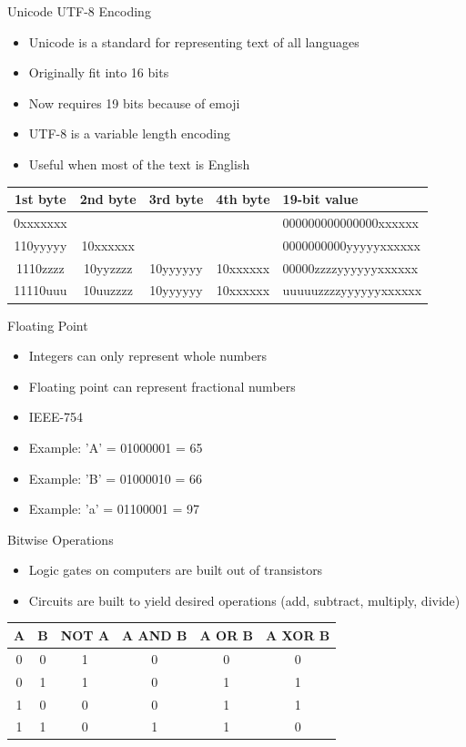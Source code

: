 \begin{withoutheadline}
\begin{frame}{Unicode UTF-8 Encoding}
\begin{itemize}
    \item Unicode is a standard for representing text of all languages
    \item Originally fit into 16 bits
    \item Now requires 19 bits because of emoji
    \item UTF-8 is a variable length encoding
    \item Useful when most of the text is English
\end{itemize}
\begin{tabular}{c|c|c|c} \toprule
1st byte & 2nd byte & 3rd byte & 4th byte & 19-bit value          \\ \midrule
0xxxxxxx &          &          &          & 000000000000000xxxxxx \\
110yyyyy & 10xxxxxx &          &          & 0000000000yyyyyxxxxxx \\
1110zzzz & 10yyzzzz & 10yyyyyy & 10xxxxxx & 00000zzzzyyyyyyxxxxxx \\
11110uuu & 10uuzzzz & 10yyyyyy & 10xxxxxx & uuuuuzzzzyyyyyyxxxxxx \\ \bottomrule
\end{tabular}
\end{frame}

\begin{frame}{Floating Point}
\begin{itemize}
    \item Integers can only represent whole numbers
    \item Floating point can represent fractional numbers
    \item IEEE-754
    \item Example: 'A' = 01000001 = 65
    \item Example: 'B' = 01000010 = 66
    \item Example: 'a' = 01100001 = 97
\end{itemize}
\end{frame}
    
\begin{frame}[fragile]{Bitwise Operations}
\begin{itemize}
    \item Logic gates on computers are built out of transistors
    \item Circuits are built to yield desired operations (add, subtract, multiply, divide)
\end{itemize}
\begin{tabular}{c|c|c|c|c|c}    \toprule
    A & B & NOT A & A AND B & A OR B & A XOR B \\ \midrule
    0 & 0 &     1 &       0 &      0 &       0 \\ 
    0 & 1 &     1 &       0 &      1 &       1 \\ 
    1 & 0 &     0 &       0 &      1 &       1 \\ 
    1 & 1 &     0 &       1 &      1 &       0 \\ \bottomrule
\end{tabular}
\end{frame}



\end{withoutheadline}
